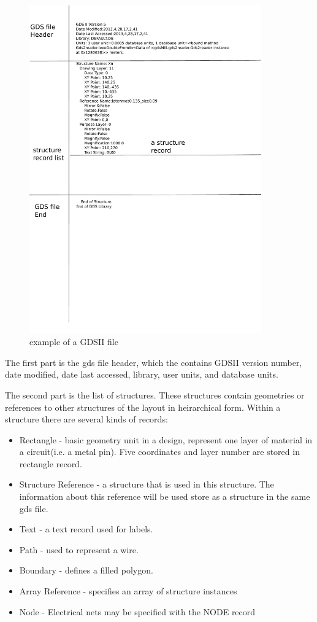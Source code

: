 \begin{figure}[htb]
\centering
\includegraphics[width=10cm]{./figs/gds_file}
\caption{example of a GDSII file}
\label{fig:gds_file}
\end{figure}

The first part is the gds file header, which the contains GDSII
version number, date modified, date last accessed, library, user
units, and database units.

The second part is the list of structures.  These structures contain
geometries or references to other structures of the layout in
heirarchical form.  Within a structure there are several kinds of
records:

\begin{itemize}
\item Rectangle - basic geometry unit in a design, represent one layer
  of material in a circuit(i.e. a metal pin). Five coordinates and
  layer number are stored in rectangle record.
\item Structure Reference - a structure that is used in this
  structure. The information about this reference will be used store
  as a structure in the same gds file.
\item Text - a text record used for labels.
\item Path - used to represent a wire.
\item Boundary - defines a filled polygon.
\item Array Reference - specifies an array of structure instances
\item Node - Electrical nets may be specified with the NODE record
\end{itemize}

